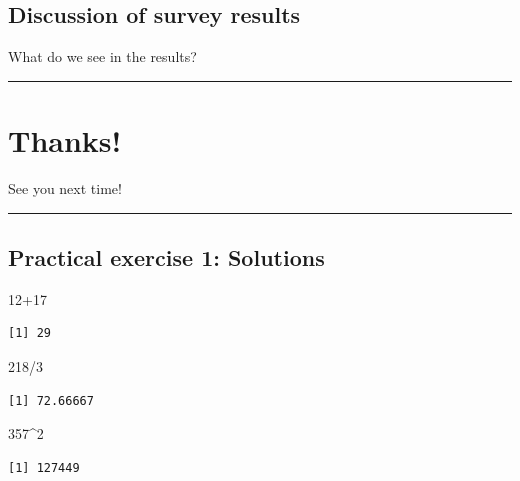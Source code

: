 \documentclass[
  letterpaper,
  DIV=11,
  numbers=noendperiod]{scrartcl}
\newenvironment{Shaded}{\begin{snugshade}}{\end{snugshade}}
\newcommand{\DecValTok}[1]{\textcolor[rgb]{0.68,0.00,0.00}{#1}}
\newcommand{\SpecialCharTok}[1]{\textcolor[rgb]{0.37,0.37,0.37}{#1}}
\begin{document}
\subsection{Discussion of survey
results}\label{discussion-of-survey-results-1}

What do we see in the results?

\begin{center}\rule{0.5\linewidth}{0.5pt}\end{center}

\section{Thanks!}\label{thanks}

See you next time!

\begin{center}\rule{0.5\linewidth}{0.5pt}\end{center}

\subsection{Practical exercise 1:
Solutions}\label{practical-exercise-1-solutions}

\begin{Shaded}
\begin{Highlighting}[]
\DecValTok{12}\SpecialCharTok{+}\DecValTok{17}
\end{Highlighting}
\end{Shaded}

\begin{verbatim}
[1] 29
\end{verbatim}

\begin{Shaded}
\begin{Highlighting}[]
\DecValTok{218}\SpecialCharTok{/}\DecValTok{3}
\end{Highlighting}
\end{Shaded}

\begin{verbatim}
[1] 72.66667
\end{verbatim}

\begin{Shaded}
\begin{Highlighting}[]
\DecValTok{357}\SpecialCharTok{\^{}}\DecValTok{2}
\end{Highlighting}
\end{Shaded}

\begin{verbatim}
[1] 127449
\end{verbatim}
\end{document}
